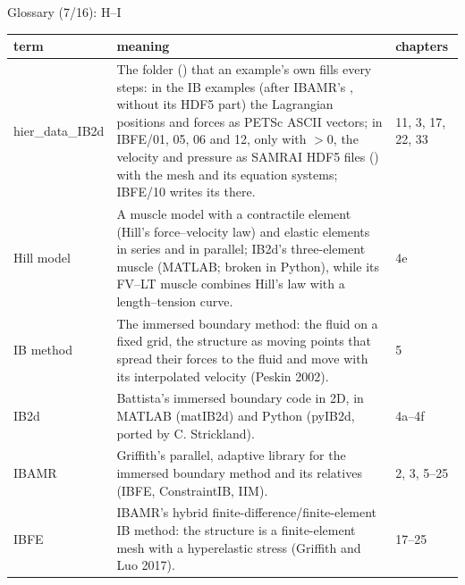 \documentclass[aspectratio=169,11pt]{beamer}
\makeatletter
\newenvironment{glossarytable}{\scriptsize\renewcommand{\arraystretch}{1.08}%
  \begin{tabular}{@{}L{0.19\textwidth}L{0.63\textwidth}L{0.12\textwidth}@{}}\toprule
  term & meaning & chapters\\\midrule}{\bottomrule\end{tabular}}
\makeatother
\begin{document}
\begin{frame}{Glossary (7/16): H--I}
\label{fr:g7}
\begin{glossarytable}
hier\_data\_IB2d & The folder () that an example's own  fills every  steps: in the IB examples (after IBAMR's , without its HDF5 part) the Lagrangian positions  and forces  as PETSc ASCII vectors; in IBFE/01, 05, 06 and 12, only with  $> 0$, the velocity and pressure as SAMRAI HDF5 files () with the mesh and its equation systems; IBFE/10 writes its  there. & 11, 3, 17, 22, 33\\
Hill model & A muscle model with a contractile element (Hill's force--velocity law) and elastic elements in series and in parallel; IB2d's three-element muscle (MATLAB; broken in Python), while its FV--LT muscle combines Hill's law with a length--tension curve. & 4e\\
IB method & The immersed boundary method: the fluid on a fixed grid, the structure as moving points that spread their forces to the fluid and move with its interpolated velocity (Peskin 2002). & 5\\
IB2d & Battista's immersed boundary code in 2D, in MATLAB (matIB2d) and Python (pyIB2d, ported by C. Strickland). & 4a--4f\\
IBAMR & Griffith's parallel, adaptive library for the immersed boundary method and its relatives (IBFE, ConstraintIB, IIM). & 2, 3, 5--25\\
IBFE & IBAMR's hybrid finite-difference/finite-element IB method: the structure is a finite-element mesh with a hyperelastic stress (Griffith and Luo 2017). & 17--25\\
\end{glossarytable}
\end{frame}
\end{document}

